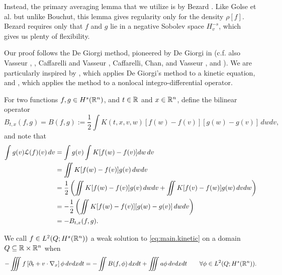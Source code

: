 Instead, the primary averaging lemma that we utilize is by Bezard \cite{Be}.  Like Golse et al. but unlike Bouchut, this lemma gives regularity only for the density $\rho[f]$.  Bezard requires only that $f$ and $g$ lie in a negative Sobolev space $H^{-s}_v$, which gives us plenty of flexibility.  

Our proof follows the De Giorgi method, pioneered by De Giorgi in \cite{DG} (c.f. also Vasseur \cite{Va.dg}, \cite{StVa.hamjac}, Caffarelli and Vasseur \cite{CaVa.sqg}, Caffarelli, Chan, and Vasseur \cite{CaChVa}, and \cite{GoImMoVa}).  We are particularly inspired by \cite{GoImMoVa}, which applies De Giorgi's method to a kinetic equation, and \cite{CaChVa}, which applies the method to a nonlocal integro-differential operator.  

For two functions $f,g \in H^s(\mathbb{R}^n)$, and $t \in \mathbb{R}$ and $x \in \mathbb{R}^n$, define the bilinear operator
\[ B_{t,x}(f,g) = B(f,g) := \frac{1}{2}\int K(t,x,v,w) [f(w)-f(v)] [g(w)-g(v)] \, dw dv, \]
and note that
\begin{align*}
\int g(v)\mathcal{L}(f)(v) \,dv &= \int g(v) \int K [f(w)-f(v)]dw \, dv 
\\ &= \iint K [f(w)-f(v)] g(v) \,dwdv
\\ &= \frac{1}{2} \left( \iint K [f(w)-f(v)]g(v) \, dwdv + \iint K [f(v)-f(w)] g(w) \,dvdw \right)
\\ &= - \frac{1}{2} \left( \iint K [f(w)-f(v)][g(w)-g(v)] \,dwdv \right)
\\ &= - B_{t,x}(f,g).
\end{align*} 

We call $f \in L^2(Q;H^s(\mathbb{R}^n))$ a weak solution to \eqref{eq:main.kinetic} on a domain $Q \subseteq \mathbb{R} \times \mathbb{R}^n$ when
\[ - \iiint f \left[ \partial_t + v\cdot \nabla_x \right] \phi \,dvdxdt = - \iint B(f,\phi) \,dxdt + \iiint a \phi \,dvdxdt \qquad \forall \phi \in L^2(Q; H^s(\mathbb{R}^n)). \]

